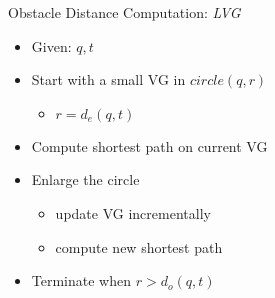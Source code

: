 \begin{frame}{Obstacle Distance Computation: \textit{LVG}}
\begin{minipage}{.4\textwidth}
\begin{itemize}
\item \small Given: $q, t$
\item \small Start with a small VG in $circle(q, r)$
\begin{itemize}
    \item \small $r=d_e(q,t)$
\end{itemize}
\item \small Compute shortest path on current VG
\item \small Enlarge the circle 
    \begin{itemize}
        \item \small update VG incrementally
        \item \small compute new shortest path
    \end{itemize}
\item \small Terminate when $r>d_o(q, t)$
\end{itemize}
\end{minipage}%
\begin{minipage}{.6\textwidth}
\begin{adjustbox}{max totalsize={.9\textwidth}{.9\textheight}, right}
    \only<1>{}
    \only<2,3>{}
    \only<4>{}
\end{adjustbox}
\end{minipage}
\end{frame}
